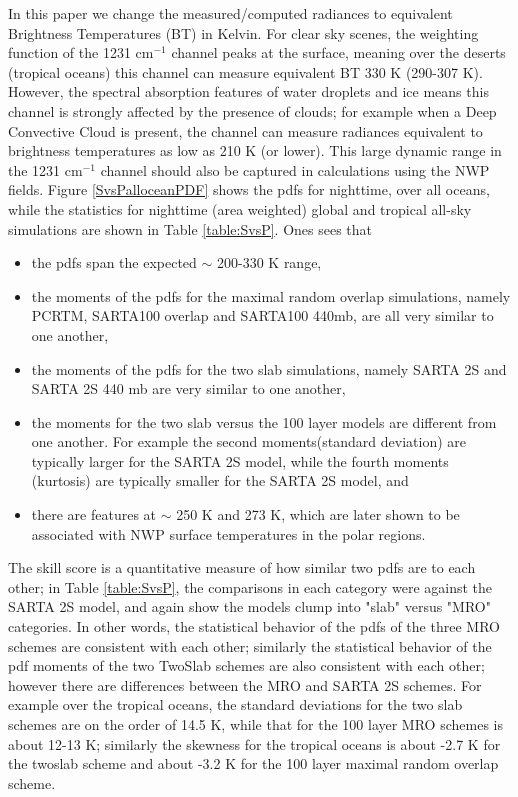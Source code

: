 \documentclass[agupp]{aguplus}              %
\newcommand{\wn}{cm$^{-1}$\xspace}
\begin{document}
\begin{article}
In this paper we change the measured/computed radiances to equivalent
Brightness Temperatures (BT) in Kelvin.  For clear sky scenes, the
weighting function of the 1231 \wn channel peaks at the surface,
meaning over the deserts (tropical oceans) this channel can measure
equivalent BT 330 K (290-307 K). However, the spectral absorption
features of water droplets and ice means this channel is strongly
affected by the presence of clouds; for example when a Deep Convective
Cloud is present, the channel can measure radiances equivalent to
brightness temperatures as low as 210 K (or lower). This large dynamic
range in the 1231 \wn channel should also be captured in calculations
using the NWP fields. Figure \ref{SvsPalloceanPDF} shows the pdfs for
nighttime, over all oceans, while the statistics for nighttime (area
weighted) global and tropical all-sky simulations are shown in Table
\ref{table:SvsP}. Ones sees that

\begin{itemize} 
  \item the pdfs span the expected $\sim$ 200-330 K range,
  \item the moments of the pdfs for the maximal random overlap simulations,
        namely PCRTM, SARTA100 overlap and SARTA100 440mb, are all very
        similar to one another, 
  \item the moments of the pdfs for the two slab simulations, namely SARTA 2S and SARTA 2S 440 mb 
         are very similar to one another, 
  \item the moments for the two slab versus the 100 layer models are different from one another.
        For example the second moments(standard deviation) are typically larger for the SARTA 2S 
        model, while the fourth moments (kurtosis) are typically smaller for the SARTA 2S model, and
  \item there are features at $\sim$ 250 K and 273 K, which are later shown to be associated with 
        NWP surface temperatures in the polar regions.
\end{itemize}

The skill score is a quantitative measure of how similar two pdfs are
to each other; in Table \ref{table:SvsP}, the comparisons in each
category were against the SARTA 2S model, and again show the models
clump into "slab" versus "MRO" categories.  In other words, the
statistical behavior of the pdfs of the three MRO schemes are
consistent with each other; similarly the statistical behavior of the
pdf moments of the two TwoSlab schemes are also consistent with each other;
however there are differences between the MRO and SARTA 2S schemes.  For
example over the tropical oceans, the standard deviations for the two
slab schemes are on the order of 14.5 K, while that for the 100 layer
MRO schemes is about 12-13 K; similarly the skewness for the tropical
oceans is about -2.7 K for the twoslab scheme and about -3.2 K for the
100 layer maximal random overlap scheme.


\end{article}
\end{document}

